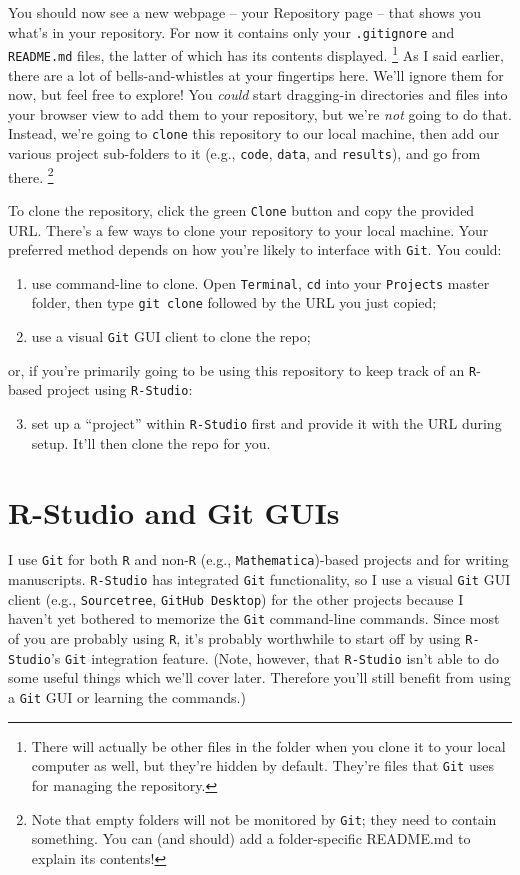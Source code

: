 \documentclass[12pt,letterpaper]{article}
\begin{document}
You should now see a new webpage -- your Repository page -- that shows you what's in your repository.
For now it contains only your \texttt{.gitignore} and \texttt{README.md} files, 
the latter of which has its contents displayed.
\unskip
\footnote{
	There will actually be other files in the folder when you clone it to your local computer as well, 
	but they're hidden by default.  
	They're files that \texttt{Git} uses for managing the repository.}
As I said earlier, there are a lot of bells-and-whistles at your fingertips here.
We'll ignore them for now, but feel free to explore!
You \emph{could} start dragging-in directories and files into your browser view 
to add them to your repository, 
but we're \emph{not} going to do that.
Instead, we're going to \texttt{clone} this repository to our local machine, 
then add our various project sub-folders to it
(e.g., \texttt{code}, \texttt{data}, and \texttt{results}), 
and go from there.
\unskip
\footnote{
	Note that empty folders will not be monitored by \texttt{Git}; 
	they need to contain something.
	You can (and should) add a folder-specific README.md to explain its contents!}

To clone the repository, 
click the green \texttt{Clone} button and copy the provided URL.
There's a few ways to clone your repository to your local machine.
Your preferred method depends on how you're likely to interface with \texttt{Git}.
You could:
\begin{enumerate}
	\item use command-line to clone.  
	Open \texttt{Terminal}, \texttt{cd} into your \texttt{Projects} master folder, 
	then type \texttt{git clone} followed by the URL you just copied;
	\item use a visual \texttt{Git} GUI client to clone the repo;
\end{enumerate}
or, if you're primarily going to be using this repository to keep track of an \texttt{R}-based project using \texttt{R-Studio}:
\begin{enumerate}
  \setcounter{enumi}{2}
	\item set up a ``project'' within \texttt{R-Studio} first and provide it with the URL during setup.  It'll then clone the repo for you.
\end{enumerate}

\section{R-Studio and Git GUIs}
I use \texttt{Git} for both \texttt{R} and non-\texttt{R} (e.g.,  \texttt{Mathematica})-based projects and for writing manuscripts.
\texttt{R-Studio} has integrated  \texttt{Git} functionality, 
so I use a visual \texttt{Git} GUI client
(e.g., \texttt{Sourcetree}, \texttt{GitHub Desktop}) 
for the other projects because I haven't yet bothered to memorize the \texttt{Git} command-line commands.
Since most of you are probably using \texttt{R}, 
it's probably worthwhile to start off by using \texttt{R-Studio}'s \texttt{Git} integration feature.
(Note, however, that \texttt{R-Studio} isn't able to do some useful things which 
we'll cover later.  
Therefore you'll still benefit from using a \texttt{Git} GUI or learning the commands.)
\end{document}
